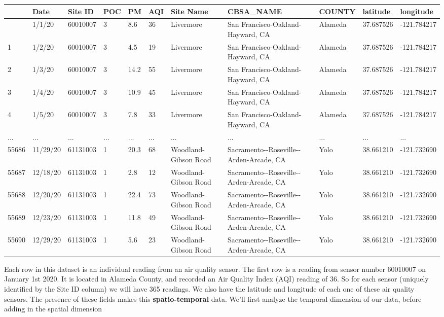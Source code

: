\documentclass[
  letterpaper,
  DIV=11,
  numbers=noendperiod]{scrreprt}
\begin{document}
\begin{longtable}[]{@{}lllllllllll@{}}
\toprule\noalign{}
& Date & Site ID & POC & PM & AQI & Site Name & CBSA\_NAME & COUNTY &
latitude & longitude \\
\midrule\noalign{}
\endhead
\bottomrule\noalign{}
\endlastfoot
0 & 1/1/20 & 60010007 & 3 & 8.6 & 36 & Livermore & San
Francisco-Oakland-Hayward, CA & Alameda & 37.687526 & -121.784217 \\
1 & 1/2/20 & 60010007 & 3 & 4.5 & 19 & Livermore & San
Francisco-Oakland-Hayward, CA & Alameda & 37.687526 & -121.784217 \\
2 & 1/3/20 & 60010007 & 3 & 14.2 & 55 & Livermore & San
Francisco-Oakland-Hayward, CA & Alameda & 37.687526 & -121.784217 \\
3 & 1/4/20 & 60010007 & 3 & 10.9 & 45 & Livermore & San
Francisco-Oakland-Hayward, CA & Alameda & 37.687526 & -121.784217 \\
4 & 1/5/20 & 60010007 & 3 & 7.8 & 33 & Livermore & San
Francisco-Oakland-Hayward, CA & Alameda & 37.687526 & -121.784217 \\
... & ... & ... & ... & ... & ... & ... & ... & ... & ... & ... \\
55686 & 11/29/20 & 61131003 & 1 & 20.3 & 68 & Woodland-Gibson Road &
Sacramento-\/-Roseville-\/-Arden-Arcade, CA & Yolo & 38.661210 &
-121.732690 \\
55687 & 12/18/20 & 61131003 & 1 & 2.8 & 12 & Woodland-Gibson Road &
Sacramento-\/-Roseville-\/-Arden-Arcade, CA & Yolo & 38.661210 &
-121.732690 \\
55688 & 12/20/20 & 61131003 & 1 & 22.4 & 73 & Woodland-Gibson Road &
Sacramento-\/-Roseville-\/-Arden-Arcade, CA & Yolo & 38.661210 &
-121.732690 \\
55689 & 12/23/20 & 61131003 & 1 & 11.8 & 49 & Woodland-Gibson Road &
Sacramento-\/-Roseville-\/-Arden-Arcade, CA & Yolo & 38.661210 &
-121.732690 \\
55690 & 12/29/20 & 61131003 & 1 & 5.6 & 23 & Woodland-Gibson Road &
Sacramento-\/-Roseville-\/-Arden-Arcade, CA & Yolo & 38.661210 &
-121.732690 \\
\end{longtable}

Each row in this dataset is an individual reading from an air quality
sensor. The first row is a reading from sensor number 60010007 on
January 1st 2020. It is located in Alameda County, and recorded an Air
Quality Index (AQI) reading of 36. So for each sensor (uniquely
identified by the Site ID column) we will have 365 readings. We also
have the latitude and longitude of each one of these air quality
sensors. The presence of these fields makes this
\textbf{spatio-temporal} data. We'll first analyze the temporal
dimension of our data, before adding in the spatial dimension
\end{document}

